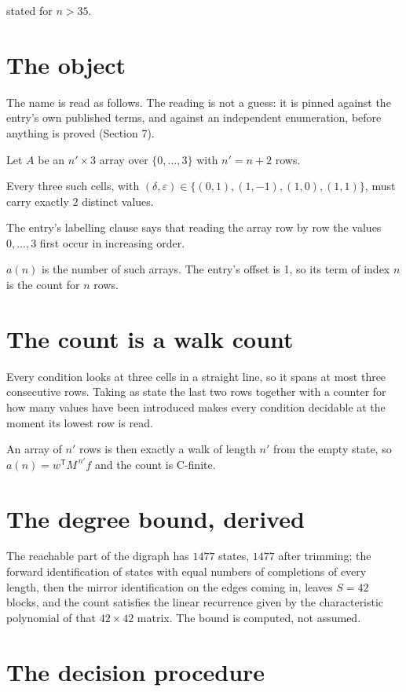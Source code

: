 \documentclass[11pt]{article}
\theoremstyle{definition}
\begin{document}
stated for $n > 35$.

\section{The object}

The name is read as follows. The reading is not a guess: it is pinned against the entry's own published terms, and against an independent enumeration, before anything is proved (Section 7).

Let $A$ be an $n' \times 3$ array over $\{0,\dots,3\}$ with $n' = n + 2$ rows.

Every three such cells, with $(\delta,\varepsilon) \in \{(0,1), (1,-1), (1,0), (1,1)\}$, must carry exactly $2$ distinct values.

The entry's labelling clause says that reading the array row by row the values $0,\dots,3$ first occur in increasing order.

$a(n)$ is the number of such arrays. The entry's offset is 1, so its term of index $n$ is the count for $n$ rows.

\section{The count is a walk count}

Every condition looks at three cells in a straight line, so it spans at most three consecutive rows. Taking as state the last two rows together with a counter for how many values have been introduced makes every condition decidable at the moment its lowest row is read.

An array of $n'$ rows is then exactly a walk of length $n'$ from the empty state, so $a(n) = w^{\mathsf T}M^{\,n'}f$ and the count is C-finite.

\section{The degree bound, derived}

The reachable part of the digraph has $1477$ states, $1477$ after trimming; the forward identification of states with equal numbers of completions of every length, then the mirror identification on the edges coming in, leaves $S = 42$ blocks, and the count satisfies the linear recurrence given by the characteristic polynomial of that $42\times42$ matrix. The bound is computed, not assumed.

\section{The decision procedure}
\end{document}
